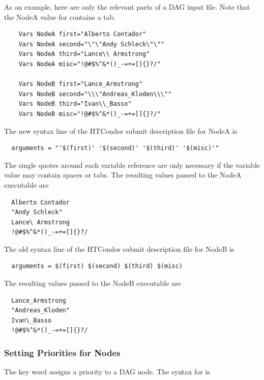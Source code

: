 As an example, here are only the relevant parts of a DAG input file.
Note that the NodeA value for  contains a tab.
\footnotesize
\begin{verbatim}
    Vars NodeA first="Alberto Contador"
    Vars NodeA second="\"\"Andy	Schleck\"\""
    Vars NodeA third="Lance\\ Armstrong"
    Vars NodeA misc="!@#$%^&*()_-=+=[]{}?/"
    
    Vars NodeB first="Lance_Armstrong"
    Vars NodeB second="\\\"Andreas_Kloden\\\""
    Vars NodeB third="Ivan\\_Basso"
    Vars NodeB misc="!@#$%^&*()_-=+=[]{}?/"
\end{verbatim}
\normalsize

The new syntax  line of the HTCondor submit description file
for NodeA is
\footnotesize
\begin{verbatim}
  arguments = "'$(first)' '$(second)' '$(third)' '$(misc)'"
\end{verbatim}
\normalsize
The single quotes around each variable reference are only necessary
if the variable value may contain spaces or tabs.
The resulting values passed to the NodeA executable are
\footnotesize
\begin{verbatim}
  Alberto Contador
  "Andy	Schleck"
  Lance\ Armstrong
  !@#$%^&*()_-=+=[]{}?/
\end{verbatim}
\normalsize

The old syntax  line of the HTCondor submit description file
for NodeB is
\footnotesize
\begin{verbatim}
  arguments = $(first) $(second) $(third) $(misc)
\end{verbatim}
\normalsize

The resulting values passed to the NodeB executable are
\footnotesize
\begin{verbatim}
  Lance_Armstrong
  "Andreas_Kloden"
  Ivan\_Basso
  !@#$%^&*()_-=+=[]{}?/
\end{verbatim}
\normalsize

\subsubsection{Setting Priorities for Nodes}

The  key word assigns a priority to a DAG node.
The syntax for  is

